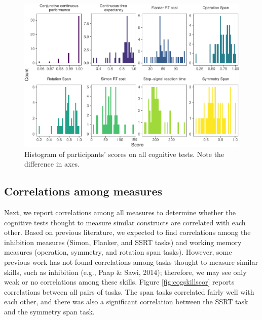 \documentclass[
  man,floatsintext]{apa6}
\begin{document}
\begin{figure}
\centering
\includegraphics{task_difficulty_ind_dif_files/figure-latex/exp1hist-1.pdf}
\caption{\label{fig:exp1hist}Histogram of participants' scores on all cognitive tests. Note the difference in axes.}
\end{figure}

\hypertarget{correlations-among-measures}{%
\subsection{Correlations among measures}\label{correlations-among-measures}}

Next, we report correlations among all measures to determine whether the cognitive tests thought to measure similar constructs are correlated with each other. Based on previous literature, we expected to find correlations among the inhibition measures (Simon, Flanker, and SSRT tasks) and working memory measures (operation, symmetry, and rotation span tasks). However, some previous work has not found correlations among tasks thought to measure similar skills, such as inhibition (e.g., Paap \& Sawi, 2014); therefore, we may see only weak or no correlations among these skills. Figure \ref{fig:cogskillscor} reports correlations between all pairs of tasks. The span tasks correlated fairly well with each other, and there was also a significant correlation between the SSRT task and the symmetry span task.
\end{document}

